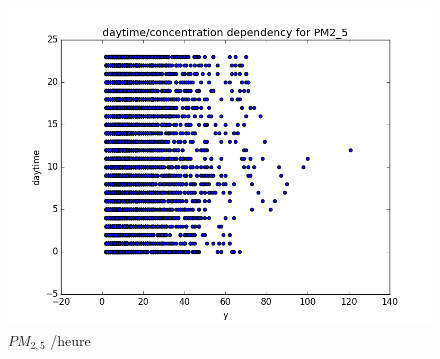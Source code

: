 \documentclass{beamer}
\begin{document}
\begin{frame}
\begin{figure}[H]
	\includegraphics[width=\linewidth]{images/PM2_5_daytime_y.png}
  \caption{$PM_{2,5}$ /heure}
	\endminipage\hfill
\end{figure}
\end{frame}
\end{document}
